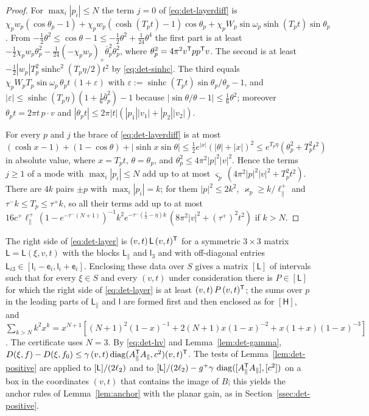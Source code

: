 \begin{proof}
For $\max_i|p_i|\le N$ the term $j=0$ of \eqref{eq:det-layerdiff} is
$\chi_pw_p(\cos\theta_p-1)+\chi_pw_p(\cosh(T_pt)-1)\cos\theta_p+\chi_pW_p\sin\omega_p\sinh(T_pt)\sin\theta_p$. From
$-\frac12\theta^2\le\cos\theta-1\le-\frac12\theta^2+\frac1{24}\theta^4$ the first part is at least
$-\frac12\chi_pw_p\theta_p^2-\frac1{24}(-\chi_pw_p)_+\bar\theta_p^2\theta_p^2$, where $\theta_p^2=4\pi^2v^\mathsf T pp^\mathsf T v$. The second is at
least $-\frac12|w_p|T_p^2\operatorname{sinhc}^2(T_p\eta/2)t^2$ by \eqref{eq:det-sinhc}. The third equals
$\chi_pW_pT_p\sin\omega_p\,\theta_pt\,(1+\varepsilon)$ with $\varepsilon:=\operatorname{sinhc}(T_pt)\sin\theta_p/\theta_p-1$, and
$|\varepsilon|\le\operatorname{sinhc}(T_p\eta)(1+\frac16\bar\theta_p^2)-1$ because $|\sin\theta/\theta-1|\le\frac16\theta^2$; moreover
$\theta_pt=2\pi t\,p\cdot v$ and $|\theta_pt|\le2\pi|t|(|p_1||v_1|+|p_2||v_2|)$.

For every $p$ and $j$ the brace of \eqref{eq:det-layerdiff} is at most
$(\cosh x-1)+(1-\cos\theta)+|\sinh x\sin\theta|\le\frac12e^{|x|}(|\theta|+|x|)^2\le e^{T_p\eta}(\theta_p^2+T_p^2t^2)$ in absolute
value, where $x=T_pt$, $\theta=\theta_p$, and $\theta_p^2\le4\pi^2|p|^2|v|^2$. Hence the terms $j\ge1$ of a mode with
$\max_i|p_i|\le N$ add up to at most $\varsigma_p\,(4\pi^2|p|^2|v|^2+T_p^2t^2)$. There are $4k$ pairs $\pm p$ with
$\max_i|p_i|=k$; for them $|p|^2\le2k^2$, $\varkappa_p\ge k/\ell_\parallel^+$ and $\tau^-k\le T_p\le\tau^+k$, so all their terms
add up to at most
$16c^+\ell_\parallel^+\,(1-e^{-\tau^-(N+1)})^{-1}k^2e^{-\tau^-(\frac12-\eta)k}\,(8\pi^2|v|^2+(\tau^+)^2t^2)$ if $k>N$.
\end{proof}

The right side of \eqref{eq:det-layer} is $(v,t)\,\mathsf L\,(v,t)^\mathsf T$ for a symmetric $3\times3$ matrix $\mathsf L=\mathsf L(\xi,v,t)$ with
the blocks $\mathsf L_\parallel$ and $\mathsf l_3$ and with off-diagonal entries $\mathsf L_{i3}\in[\mathsf l_i-\mathsf e_i,\mathsf l_i+\mathsf e_i]$.
Enclosing these data over $S$ gives a matrix $[\mathsf L]$ of intervals such that for every $\xi\in S$ and every $(v,t)$ under
consideration there is $P\in[\mathsf L]$ for which the right side of \eqref{eq:det-layer} is at least $(v,t)\,P\,(v,t)^\mathsf T$; the
sums over $p$ in the leading parts of $\mathsf L_\parallel$ and $\mathsf l$ are formed first and then enclosed as for
$[\mathsf H]$, and
$\sum_{k>N}k^2x^k=x^{N+1}[(N+1)^2(1-x)^{-1}+2(N+1)x(1-x)^{-2}+x(1+x)(1-x)^{-3}]$. The certificate uses $N=3$. By \eqref{eq:det-hv}
and Lemma~\ref{lem:det-gamma}, $D(\xi,f)-D(\xi,f_0)\le\gamma\,(v,t)\operatorname{diag}(A_\parallel^\mathsf T A_\parallel,c^2)(v,t)^\mathsf T$. The tests of
Lemma~\ref{lem:det-positive} are applied to $[\mathsf L]/(2\ell_2)$ and to
$[\mathsf L]/(2\ell_2)-g^+\gamma\,\operatorname{diag}([A_\parallel^\mathsf T A_\parallel],[c^2])$ on a box in the coordinates $(v,t)$ that contains the
image of $B$; this yields the anchor rules of Lemma~\ref{lem:anchor} with the planar gain, as in Section~\ref{ssec:det-positive}.

